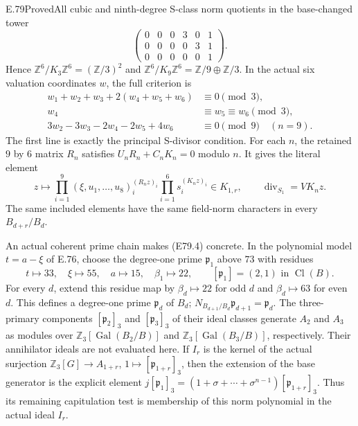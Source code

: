 \begin{statement}{E.79}{Proved}{All cubic and ninth-degree S-class norm quotients in the base-changed tower}
\[\begin{pmatrix}
 0&0&0&3&0&1\\0&0&0&0&3&1\\0&0&0&0&0&1
 \end{pmatrix}.
 \tag{E79.7}
\]
Hence $\mathbb Z^6/K_3\mathbb Z^6=(\mathbb Z/3)^2$
and $\mathbb Z^6/K_9\mathbb Z^6=\mathbb Z/9\oplus\mathbb Z/3$.
In the actual six valuation coordinates $w$, the full criterion is
\[
 \begin{aligned}
 w_1+w_2+w_3+2(w_4+w_5+w_6)&\equiv0\pmod3,\\
 w_4&\equiv w_5\equiv w_6\pmod3,\\
 3w_2-3w_3-2w_4-2w_5+4w_6&\equiv0\pmod9\quad(n=9).
 \end{aligned}
 \tag{E79.8}
\]
The first line is exactly the principal S-divisor condition.
For each $n$, the retained $9$ by $6$ matrix $R_n$ satisfies
$U_nR_n+C_nK_n=0$ modulo $n$. It gives the literal element
\[
 z\longmapsto
 \prod_{i=1}^{9}(\xi,u_1,\ldots,u_8)_i^{(R_nz)_i}
 \prod_{i=1}^{6}s_i^{(K_nz)_i}\in K_{1,r},
 \qquad \operatorname{div}_{S_1}=VK_nz.
 \tag{E79.9}
\]
The same included elements have the same field-norm characters
in every $B_{d+r}/B_d$.

An actual coherent prime chain makes (E79.4) concrete. In the
polynomial model $t=a-\xi$ of E.76, choose the degree-one prime
$\mathfrak p_1$ above $73$ with residues
\[
 t\mapsto33,\quad \xi\mapsto55,\quad a\mapsto15,
 \quad\beta_1\mapsto22,\qquad [\mathfrak p_1]=(2,1)
       \text{ in }\operatorname{Cl}(B).
 \tag{E79.10}
\]
For every $d$, extend this residue map by
$\beta_d\mapsto22$ for odd $d$ and $\beta_d\mapsto63$ for even
$d$. This defines a degree-one prime $\mathfrak p_d$ of $B_d$;
$N_{B_{d+1}/B_d}\mathfrak p_{d+1}=\mathfrak p_d$.
The three-primary components $[\mathfrak p_2]_3$ and
$[\mathfrak p_3]_3$ of their ideal classes generate
$A_2$ and $A_3$ as modules over
$\mathbb Z_3[\operatorname{Gal}(B_2/B)]$ and
$\mathbb Z_3[\operatorname{Gal}(B_3/B)]$, respectively. Their
annihilator ideals are not evaluated here. If $I_r$ is the
kernel of the actual surjection
$\mathbb Z_3[G]\to A_{1+r}$, $1\mapsto[\mathfrak p_{1+r}]_3$,
then the extension of the base generator is the explicit element
$j[\mathfrak p_1]_3=(1+\sigma+\cdots+\sigma^{n-1})
[\mathfrak p_{1+r}]_3$. Thus its remaining capitulation test is
membership of this norm polynomial in the actual ideal $I_r$.


\end{statement}
